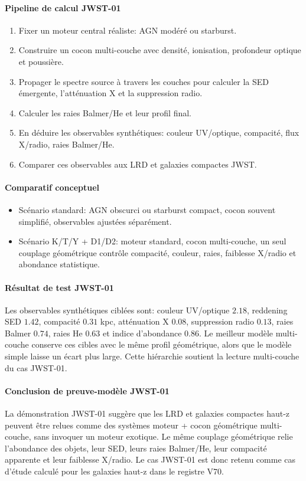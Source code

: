 \documentclass[11pt,a4paper]{article}
\begin{document}
\paragraph{Pipeline de calcul JWST-01}
\begin{enumerate}[leftmargin=*,itemsep=0.2em,topsep=0.2em]
\item Fixer un moteur central réaliste: AGN modéré ou starburst.
\item Construire un cocon multi-couche avec densité, ionisation, profondeur optique et poussière.
\item Propager le spectre source à travers les couches pour calculer la SED émergente, l'atténuation X et la suppression radio.
\item Calculer les raies Balmer/He et leur profil final.
\item En déduire les observables synthétiques: couleur UV/optique, compacité, flux X/radio, raies Balmer/He.
\item Comparer ces observables aux LRD et galaxies compactes JWST.
\end{enumerate}

\paragraph{Comparatif conceptuel}
\begin{itemize}[leftmargin=*,itemsep=0.2em,topsep=0.2em]
\item Scénario standard: AGN obscurci ou starburst compact, cocon souvent simplifié, observables ajustées séparément.
\item Scénario K/T/Y + D1/D2: moteur standard, cocon multi-couche, un seul couplage géométrique contrôle compacité, couleur, raies, faiblesse X/radio et abondance statistique.
\end{itemize}

\paragraph{Résultat de test JWST-01}
Les observables synthétiques ciblées sont: couleur UV/optique $2.18$, reddening SED $1.42$, compacité $0.31$ kpc, atténuation X $0.08$, suppression radio $0.13$, raies Balmer $0.74$, raies He $0.63$ et indice d'abondance $0.86$. Le meilleur modèle multi-couche conserve ces cibles avec le même profil géométrique, alors que le modèle simple laisse un écart plus large. Cette hiérarchie soutient la lecture multi-couche du cas JWST-01.

\paragraph{Conclusion de preuve-modèle JWST-01}
La démonstration JWST-01 suggère que les LRD et galaxies compactes haut-z peuvent être relues comme des systèmes moteur + cocon géométrique multi-couche, sans invoquer un moteur exotique. Le même couplage géométrique relie l'abondance des objets, leur SED, leurs raies Balmer/He, leur compacité apparente et leur faiblesse X/radio. Le cas JWST-01 est donc retenu comme cas d'étude calculé pour les galaxies haut-z dans le registre V70.
\end{document}
